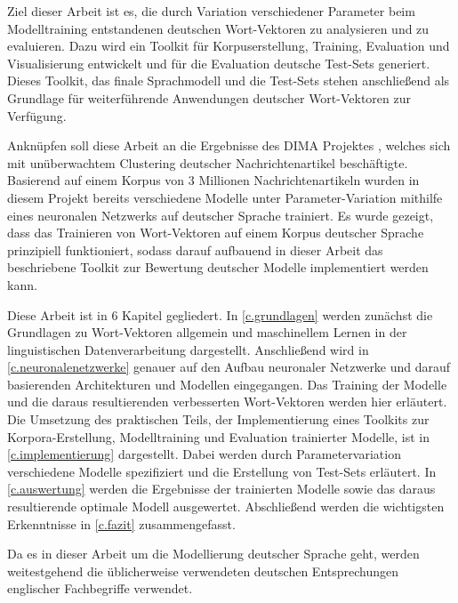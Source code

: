 Ziel dieser Arbeit ist es, die durch Variation verschiedener Parameter beim Modelltraining entstandenen deutschen Wort-Vektoren zu analysieren und zu evaluieren. Dazu wird ein Toolkit für Korpuserstellung, Training, Evaluation und Visualisierung entwickelt und für die Evaluation deutsche Test-Sets generiert. Dieses Toolkit, das finale Sprachmodell und die Test-Sets stehen anschließend als Grundlage für weiterführende Anwendungen deutscher Wort-Vektoren zur Verfügung.

Anknüpfen soll diese Arbeit an die Ergebnisse des DIMA Projektes  \citep{Arras2014}, welches sich mit unüberwachtem Clustering deutscher Nachrichtenartikel beschäftigte. Basierend auf einem Korpus von 3 Millionen Nachrichtenartikeln wurden in diesem Projekt bereits verschiedene Modelle unter Parameter-Variation mithilfe eines neuronalen Netzwerks auf deutscher Sprache trainiert. Es wurde gezeigt, dass das Trainieren von Wort-Vektoren auf einem Korpus deutscher Sprache prinzipiell funktioniert, sodass darauf aufbauend in dieser Arbeit das beschriebene Toolkit zur Bewertung deutscher Modelle implementiert werden kann.

Diese Arbeit ist in 6 Kapitel gegliedert. In \autoref{c.grundlagen} werden zunächst die Grundlagen zu Wort-Vektoren allgemein und maschinellem Lernen in der linguistischen Datenverarbeitung dargestellt. Anschließend wird in \autoref{c.neuronalenetzwerke} genauer auf den Aufbau neuronaler Netzwerke und darauf basierenden Architekturen und Modellen eingegangen. Das Training der Modelle und die daraus resultierenden verbesserten Wort-Vektoren werden hier erläutert. Die Umsetzung des praktischen Teils, der Implementierung eines Toolkits zur Korpora-Erstellung, Modelltraining und Evaluation trainierter Modelle, ist in \autoref{c.implementierung} dargestellt. Dabei werden durch Parametervariation verschiedene Modelle spezifiziert und die Erstellung von Test-Sets erläutert. In \autoref{c.auswertung} werden die Ergebnisse der trainierten Modelle sowie das daraus resultierende optimale Modell ausgewertet. Abschließend werden die wichtigsten Erkenntnisse in \autoref{c.fazit} zusammengefasst.

Da es in dieser Arbeit um die Modellierung deutscher Sprache geht, werden weitestgehend die üblicherweise verwendeten deutschen Entsprechungen englischer Fachbegriffe verwendet.

